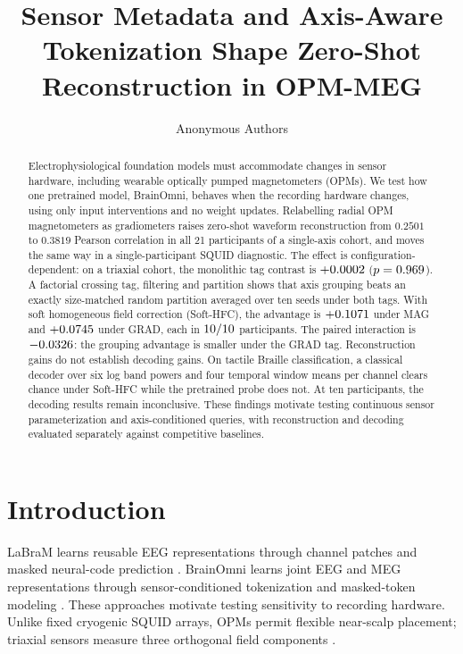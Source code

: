 \documentclass[letterpaper]{article}
\title{Sensor Metadata and Axis-Aware Tokenization Shape Zero-Shot Reconstruction in OPM-MEG}
\author{Anonymous Authors}
\begin{document}
\maketitle

\begin{abstract}
Electrophysiological foundation models must accommodate changes in sensor hardware, including wearable optically pumped magnetometers (OPMs). We test how one pretrained model, BrainOmni, behaves when the recording hardware changes, using only input interventions and no weight updates. Relabelling radial OPM magnetometers as gradiometers raises zero-shot waveform reconstruction from $0.2501$ to $0.3819$ Pearson correlation in all 21 participants of a single-axis cohort, and moves the same way in a single-participant SQUID diagnostic. The effect is configuration-dependent: on a triaxial cohort, the monolithic tag contrast is $+0.0002$ ($p=0.969$). A factorial crossing tag, filtering and partition shows that axis grouping beats an exactly size-matched random partition averaged over ten seeds under both tags. With soft homogeneous field correction (Soft-HFC), the advantage is $+0.1071$ under MAG and $+0.0745$ under GRAD, each in $10/10$ participants. The paired interaction is $-0.0326$: the grouping advantage is smaller under the GRAD tag. Reconstruction gains do not establish decoding gains. On tactile Braille classification, a classical decoder over six log band powers and four temporal window means per channel clears chance under Soft-HFC while the pretrained probe does not. At ten participants, the decoding results remain inconclusive. These findings motivate testing continuous sensor parameterization and axis-conditioned queries, with reconstruction and decoding evaluated separately against competitive baselines.
\end{abstract}

\section{Introduction}
LaBraM learns reusable EEG representations through channel patches and masked neural-code prediction \citep{jiang2024labram}. BrainOmni learns joint EEG and MEG representations through sensor-conditioned tokenization and masked-token modeling \citep{xiao2025brainomni}. These approaches motivate testing sensitivity to recording hardware. Unlike fixed cryogenic SQUID arrays, OPMs permit flexible near-scalp placement; triaxial sensors measure three orthogonal field components \citep{rea2022triaxial}.
\end{document}
